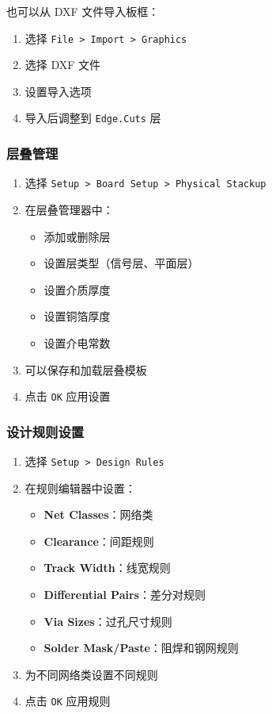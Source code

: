 也可以从 DXF 文件导入板框：

\begin{enumerate}
  \item 选择 \lstinline{File > Import > Graphics}
  \item 选择 DXF 文件
  \item 设置导入选项
  \item 导入后调整到 \lstinline{Edge.Cuts} 层
\end{enumerate}

\subsubsection{层叠管理}


\begin{enumerate}
  \item 选择 \lstinline{Setup > Board Setup > Physical Stackup}
  \item 在层叠管理器中：
    \begin{itemize}
      \item 添加或删除层
      \item 设置层类型（信号层、平面层）
      \item 设置介质厚度
      \item 设置铜箔厚度
      \item 设置介电常数
    \end{itemize}
  \item 可以保存和加载层叠模板
  \item 点击 \lstinline{OK} 应用设置
\end{enumerate}

\subsubsection{设计规则设置}


\begin{enumerate}
  \item 选择 \lstinline{Setup > Design Rules}
  \item 在规则编辑器中设置：
    \begin{itemize}
      \item \textbf{Net Classes}：网络类
      \item \textbf{Clearance}：间距规则
      \item \textbf{Track Width}：线宽规则
      \item \textbf{Differential Pairs}：差分对规则
      \item \textbf{Via Sizes}：过孔尺寸规则
      \item \textbf{Solder Mask/Paste}：阻焊和钢网规则
    \end{itemize}
  \item 为不同网络类设置不同规则
  \item 点击 \lstinline{OK} 应用规则
\end{enumerate}

